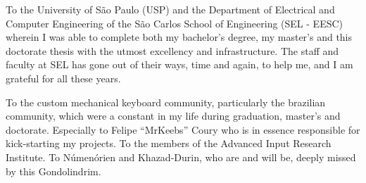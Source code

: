 \documentclass{apaThesis}
\begin{document}
\begin{acknowledgements}
	To the University of São Paulo (USP) and the Department of Electrical and Computer Engineering of the São Carlos School of Engineering (SEL - EESC) wherein I was able to complete both my bachelor's degree, my master's and this doctorate thesis with the utmost excellency and infrastructure. The staff and faculty at SEL has gone out of their ways, time and again, to help me, and I am grateful for all these years.

	To the custom mechanical keyboard community, particularly the brazilian community, which were a constant in my life during graduation, master's and doctorate. Especially to Felipe ``MrKeebs'' Coury who is in essence responsible for kick-starting my projects. To the members of the Advanced Input Research Institute. To Númenórien and Khazad-Durin, who are and will be, deeply missed by this Gondolindrim.

\end{acknowledgements}


\listoffigures
\cleardoublepage

\listoftables
\cleardoublepage

\begingroup
	\makeatletter
		\def\chapter{\cleardoublepage\secdef\@chapter\@schapter}
		\def\@makeschapterhead#1{{\center\HUGE\sffamily\bfseries #1\par\nobreak\vskip 10\p@\vspace*{5mm} }}
	\makeatother
\end{document}
